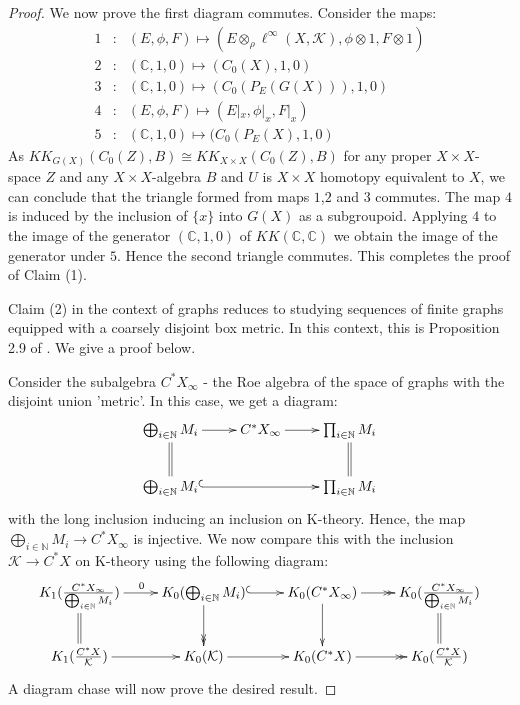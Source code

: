 \documentclass[11pt]{amsart}
\theoremstyle{plain}
\theoremstyle{definition}%
\theoremstyle{remark}%
\begin{document}
{\begin{proof}
We now prove the first diagram commutes. Consider the maps:
\begin{eqnarray*}
1 & : & (E,\phi , F) \mapsto (E\otimes_{\rho}\ell^{\infty}(X,\mathcal{K}),\phi \otimes 1 , F \otimes 1)\\
2 & : & (\mathbb{C},1,0) \mapsto (C_{0}(X),1,0)\\
3 & : & (\mathbb{C},1,0) \mapsto (C_{0}(P_{E}(G(X))),1,0)\\
4 & : & (E,\phi , F) \mapsto (E|_{x},\phi|_{x},F|_{x})\\
5 & : & (\mathbb{C},1,0) \mapsto (C_{0}(P_{E}(X),1,0)
\end{eqnarray*}
As $KK_{G(X)}(C_{0}(Z),B) \cong KK_{X\times X}(C_{0}(Z),B)$ for any proper $X\times X$-space $Z$ and any $X \times X$-algebra $B$ and $U$ is $X\times X$ homotopy equivalent to $X$, we can conclude that the triangle formed from maps $1$,$2$ and $3$ commutes. The map $4$ is induced by the inclusion of $\lbrace x \rbrace$ into $G(X)$ as a subgroupoid. Applying $4$ to the image of the generator $(\mathbb{C},1,0)$ of $KK(\mathbb{C},\mathbb{C})$ we obtain the image of the generator under $5$. Hence the second triangle commutes. This completes the proof of Claim (1).

Claim (2) in the context of graphs reduces to studying sequences of finite graphs equipped with a coarsely disjoint box metric. In this context, this is Proposition 2.9 of \cite{mypub1}. We give a proof below.

Consider the subalgebra $C^{*}X_{\infty}$ - the Roe algebra of the space of graphs with the disjoint union 'metric'. In this case, we get a diagram:
\begin{equation*}
\xymatrix{\bigoplus_{i \in \mathbb{N}} M_{i} \ar@{->}[r]\ar@{=}[d]  & C^{*}X_{\infty} \ar@{->}[r]& \prod_{i\in \mathbb{N}}M_{i}\ar@{=}[d]\\
\bigoplus_{i \in \mathbb{N}} M_{i}\ar@{^{(}->}[rr] & & \prod_{i\in \mathbb{N}}M_{i}
}
\end{equation*}
with the long inclusion inducing an inclusion on K-theory. Hence, the map $\bigoplus_{i \in \mathbb{N}} M_{i} \rightarrow C^{*}X_{\infty}$ is injective. We now compare this with the inclusion $\mathcal{K} \rightarrow C^{*}X$ on K-theory using the following diagram:
\begin{equation*}
\xymatrix{K_{1}(\frac{C^{*}X_{\infty}}{\bigoplus_{i\in\mathbb{N}}M_{i}})\ar@{->}[r]^{0}\ar@{=}[d]& K_{0}(\bigoplus_{i\in \mathbb{N}}M_{i}) \ar@{^{(}->}[r]\ar@{->>}[d] & K_{0}(C^{*}X_{\infty}) \ar@{->>}[r] \ar@{->}[d] & K_{0}(\frac{C^{*}X_{\infty}}{\bigoplus_{i\in\mathbb{N}}M_{i}})\ar@{=}[d]\\
K_{1}(\frac{C^{*}X}{\mathcal{K}})\ar@{->}[r]& K_{0}(\mathcal{K}) \ar@{->}[r] & K_{0}(C^{*}X) \ar@{->>}[r]  & K_{0}(\frac{C^{*}X}{\mathcal{K}})}
\end{equation*}
A diagram chase will now prove the desired result.
\end{proof}

}
\end{document}
